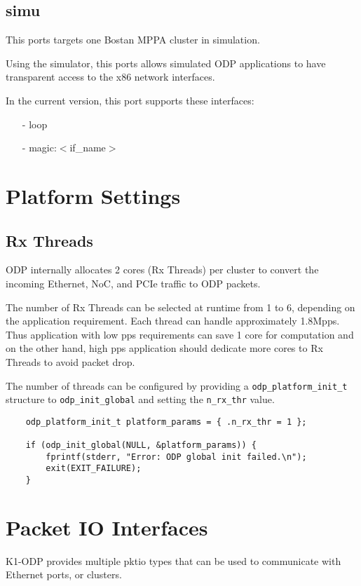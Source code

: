\documentclass{trkalray}
\begin{document}
\subsection{simu}

This ports targets one Bostan MPPA cluster in simulation.

Using the simulator, this ports allows simulated ODP applications to
have transparent access to the x86 network interfaces.

In the current version, this port supports these interfaces:
\begin{itemize}
\item[-]{loop}
\item[-]{magic:$<$if\_name$>$}
\end{itemize}

\section{Platform Settings}
\subsection{Rx Threads}
ODP internally allocates 2 cores (Rx Threads) per cluster to convert the incoming
Ethernet, NoC, and PCIe traffic to ODP packets.

The number of Rx Threads can be selected at runtime from 1 to 6,
depending on the application requirement. Each thread can handle
approximately 1.8Mpps. Thus application with low pps requirements can
save 1 core for computation and on the other hand, high pps
application should dedicate more cores to Rx Threads to avoid packet
drop.

The number of threads can be configured by providing a
\texttt{odp\_platform\_init\_t} structure to
\texttt{odp\_init\_global} and setting the \texttt{n\_rx\_thr} value.

\begin{lstlisting}
	odp_platform_init_t platform_params = { .n_rx_thr = 1 };

	if (odp_init_global(NULL, &platform_params)) {
		fprintf(stderr, "Error: ODP global init failed.\n");
		exit(EXIT_FAILURE);
	}
\end{lstlisting}

\section{Packet IO Interfaces}

K1-ODP provides multiple pktio types that can be used to communicate
with Ethernet ports, or clusters.
\end{document}
